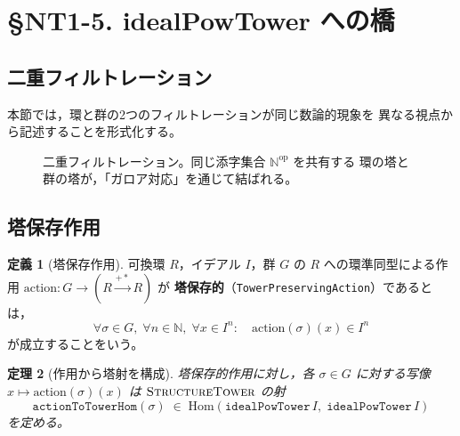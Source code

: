 \documentclass[a4paper,11pt]{ltjsarticle}
\theoremstyle{definition}
\newtheorem{definition}{定義}[section]
\theoremstyle{plain}
\newtheorem{theorem}[definition]{定理}
\theoremstyle{remark}
\newcommand{\Hom}{\mathrm{Hom}}
\begin{document}
\section{§NT1-5. idealPowTower への橋}

\subsection{二重フィルトレーション}

本節では，環と群の2つのフィルトレーションが同じ数論的現象を
異なる視点から記述することを形式化する。

\begin{figure}[H]
\centering
{}
\caption{二重フィルトレーション。同じ添字集合 $\mathbb{N}^{\mathrm{op}}$ を共有する
環の塔と群の塔が，「ガロア対応」を通じて結ばれる。}
\label{fig:double-filtration}
\end{figure}

\subsection{塔保存作用}

\begin{definition}[塔保存作用]\label{def:tower-preserving-action}
  可換環 $R$，イデアル $I$，群 $G$ の $R$ への環準同型による作用
  $\mathrm{action}\colon G \to (R \xrightarrow{+*} R)$ が
  \textbf{塔保存的}（\texttt{TowerPreservingAction}）であるとは，
  \[
    \forall \sigma \in G,\;\forall n \in \mathbb{N},\;\forall x \in I^n\colon
    \quad \mathrm{action}(\sigma)(x) \in I^n
  \]
  が成立することをいう。
\end{definition}

\begin{theorem}[作用から塔射を構成]\label{thm:action-to-tower-hom}
  塔保存的作用に対し，各 $\sigma \in G$ に対する写像
  $x \mapsto \mathrm{action}(\sigma)(x)$
  は $\textsc{StructureTower}$ の射
  \[
    \texttt{actionToTowerHom}(\sigma)
    \;\in\;
    \Hom(\texttt{idealPowTower}\,I,\;\texttt{idealPowTower}\,I)
  \]
  を定める。
\end{theorem}
\end{document}
